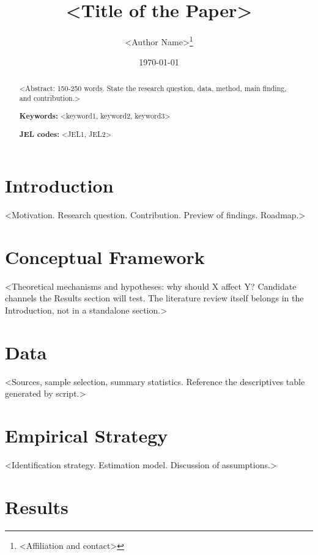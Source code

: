 \documentclass[12pt,a4paper]{article}
\title{<Title of the Paper>}
\author{<Author Name>\thanks{<Affiliation and contact>}}
\date{\today}
\begin{document}
\maketitle

\begin{abstract}
\noindent <Abstract: 150-250 words. State the research question, data, method,
main finding, and contribution.>

\noindent\textbf{Keywords:} <keyword1, keyword2, keyword3>

\noindent\textbf{JEL codes:} <JEL1, JEL2>  %
\end{abstract}

\section{Introduction}
\label{sec:intro}

<Motivation. Research question. Contribution. Preview of findings. Roadmap.>

\section{Conceptual Framework}
\label{sec:framework}

<Theoretical mechanisms and hypotheses: why should X affect Y? Candidate
channels the Results section will test. The literature review itself belongs
in the Introduction, not in a standalone section.>

\section{Data}
\label{sec:data}

<Sources, sample selection, summary statistics. Reference the descriptives
table generated by script.>



\section{Empirical Strategy}
\label{sec:methods}

<Identification strategy. Estimation model. Discussion of assumptions.>

\section{Results}
\label{sec:results}
\end{document}
